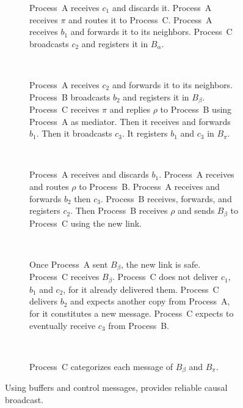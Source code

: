 \begin{figure*}
\begin{center}
    \begin{subfigure}[t]{0.46\textwidth}
      \caption{\label{fig:solveF}Process~A receives $c_1$ and discards it.
        Process~A receives $\pi$ and routes it to Process~C. Process~A receives
        $b_1$ and forwards it to its neighbors. Process~C broadcasts $c_2$ and
        registers it in $B_\alpha$.}
    \end{subfigure}
    ~
    \begin{subfigure}[t]{0.51\textwidth}
      \caption{\label{fig:solveG}Process~A receives $c_2$ and forwards it to
        its neighbors.  Process~B broadcasts $b_2$ and registers it in
        $B_\beta$. Process~C receives $\pi$ and replies $\rho$ to Process~B
        using Process~A as mediator. Then it receives and forwards $b_1$. Then
        it broadcasts $c_3$. It registers $b_1$ and $c_3$ in $B_\pi$.}
    \end{subfigure}
    \\
    \begin{subfigure}[t]{0.44\textwidth}
      \caption{\label{fig:solveH}Process~A receives and discards $b_1$.
        Process~A receives and routes $\rho$ to Process~B.  Process~A receives
        and forwards $b_2$ then $c_3$. Process~B receives, forwards, and
        registers $c_2$. Then Process~B receives $\rho$ and sends $B_\beta$ to
        Process~C using the new link.}
    \end{subfigure}
    ~
    \begin{subfigure}[t]{0.53\textwidth}
      \caption{\label{fig:solveI}Once Process~A sent $B_\beta$, the new link is
        safe.  Process~C receives $B_\beta$. Process~C does not deliver $c_1$, $b_1$
        and $c_2$, for it already delivered them. Process~C delivers $b_2$ and
        expects another copy from Process~A, for it constitutes a new message.
        Process~C expects to eventually receive $c_3$ from Process~B.}
    \end{subfigure}
    \\
    \begin{subfigure}{1\textwidth}
      \begin{center}
      \caption{\label{fig:solveJ}Process~C categorizes each message of $B_\beta$
        and $B_\pi$.}%
      \end{center}
    \end{subfigure}%
    \caption{\label{fig:solve}Using buffers and control messages, \RPCBROADCAST 
      provides reliable causal broadcast.}
  \end{center}
\end{figure*}





